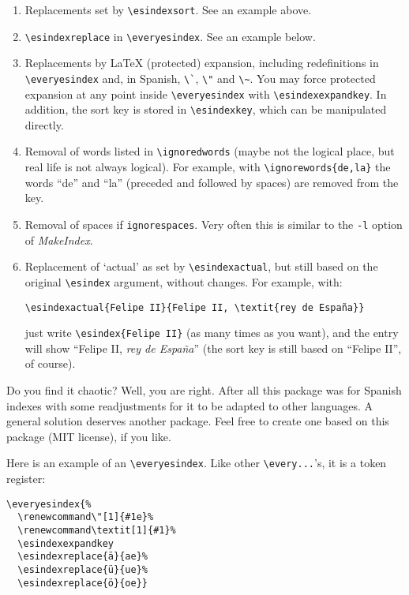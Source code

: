 \documentclass[a4paper]{ltxguide}
\begin{document}
\begin{enumerate}
\item Replacements set by \verb|\esindexsort|. See an example above.

\item \verb|\esindexreplace| in \verb|\everyesindex|. See an example
below.

\item Replacements by \LaTeX{} (protected) expansion, including
redefinitions in \verb|\everyesindex| and, in Spanish, \verb|\`|,
\verb|\"| and \verb|\~|. You may force protected expansion at any point
inside \verb|\everyesindex| with \verb|\esindexexpandkey|. In addition,
the sort key is stored in \verb|\esindexkey|, which can be manipulated
directly.

\item Removal of words listed in \verb|\ignoredwords| (maybe not the
logical place, but real life is not always logical). For example, with
\verb|\ignorewords{de,la}| the words “de” and “la” (preceded and
followed by spaces) are removed from the key.

\item Removal of spaces if \verb|ignorespaces|. Very often this is
similar to the \verb|-l| option of \textit{MakeIndex}.

\item Replacement of `actual' as set by \verb|\esindexactual|, but
still based on the original \verb|\esindex| argument, without changes.
For example, with:
\begin{verbatim}
\esindexactual{Felipe II}{Felipe II, \textit{rey de España}}
\end{verbatim}
just write \verb|\esindex{Felipe II}| (as many times as you want), and
the entry will show “Felipe II, \textit{rey de España}” (the sort key
is still based on “Felipe II”, of course).

\end{enumerate}

Do you find it chaotic? Well, you are right. After all this package was
for Spanish indexes with some readjustments for it to be adapted to
other languages. A general solution deserves another package. Feel free
to create one based on this package (MIT license), if you like.

Here is an example of an \verb|\everyesindex|. Like other
\verb|\every...|'s, it is a token register:
\begin{verbatim}
\everyesindex{%
  \renewcommand\"[1]{#1e}%
  \renewcommand\textit[1]{#1}%
  \esindexexpandkey
  \esindexreplace{ä}{ae}%
  \esindexreplace{ü}{ue}%
  \esindexreplace{ö}{oe}}
\end{verbatim}
\end{document}
